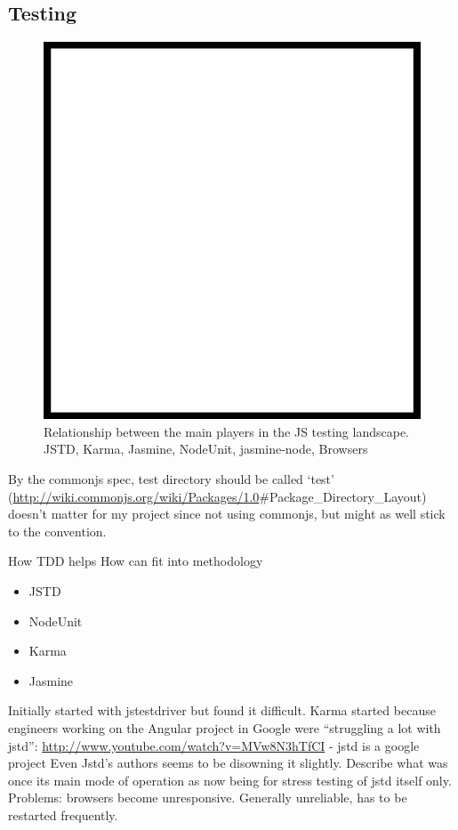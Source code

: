 \documentclass[]{article}
\makeatletter
\def\maxwidth{\ifdim\Gin@nat@width>\linewidth\linewidth
\else\Gin@nat@width\fi}
\let\Oldincludegraphics\includegraphics
\renewcommand{\includegraphics}[1]{\Oldincludegraphics[width=\maxwidth]{#1}}
\makeatother
\begin{document}
\subsection{Testing}

\begin{figure}[htbp]
\centering
\includegraphics{images/placeholder.png}
\caption{Relationship between the main players in the JS testing
landscape. JSTD, Karma, Jasmine, NodeUnit, jasmine-node, Browsers}
\end{figure}

By the commonjs spec, test directory should be called `test'
(\url{http://wiki.commonjs.org/wiki/Packages/1.0}\#Package\_Directory\_Layout)
doesn't matter for my project since not using commonjs, but might as
well stick to the convention.

How TDD helps How can fit into methodology

\begin{itemize}
\itemsep1pt\parskip0pt
\item
  JSTD
\item
  NodeUnit
\item
  Karma
\item
  Jasmine
\end{itemize}

Initially started with jstestdriver but found it difficult. Karma
started because engineers working on the Angular project in Google were
``struggling a lot with jstd'':
\url{http://www.youtube.com/watch?v=MVw8N3hTfCI} - jstd is a google
project Even Jstd's authors seems to be disowning it slightly. Describe
what was once its main mode of operation as now being for stress testing
of jstd itself only. Problems: browsers become unresponsive. Generally
unreliable, has to be restarted frequently.
\end{document}
